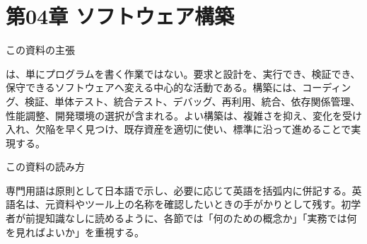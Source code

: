 \section{第04章 ソフトウェア構築}
\noindent この資料の主張

は、単にプログラムを書く作業ではない。要求と設計を、実行でき、検証でき、保守できるソフトウェアへ変える中心的な活動である。構築には、コーディング、検証、単体テスト、統合テスト、デバッグ、再利用、統合、依存関係管理、性能調整、開発環境の選択が含まれる。よい構築は、複雑さを抑え、変化を受け入れ、欠陥を早く見つけ、既存資産を適切に使い、標準に沿って進めることで実現する。

\begin{plainbox}
この資料の読み方

専門用語は原則として日本語で示し、必要に応じて英語を括弧内に併記する。英語名は、元資料やツール上の名称を確認したいときの手がかりとして残す。初学者が前提知識なしに読めるように、各節では「何のための概念か」「実務では何を見ればよいか」を重視する。
\end{plainbox}
